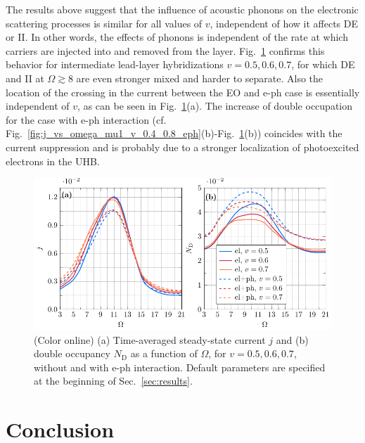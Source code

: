 \documentclass[aps,prb,groupedaddress,showpacs,twocolumn,superscriptaddress,10pt]{revtex4-2}
\begin{document}
The results above suggest that the influence of acoustic phonons on the electronic scattering processes is similar for all values of $v$, independent of how it affects DE or II. In other words, the effects of phonons is independent of the rate at which carriers are injected into and removed from the layer.
 Fig.~\ref{fig:j_vs_omega_mu1_sweep_v_E0_2_eph} confirms this behavior for intermediate lead-layer hybridizations $v=0.5,0.6,0.7$, for which DE and II at $\Omega\gtrsim8$ are even stronger mixed and harder to separate. Also the location of the crossing in the current  between the EO and e-ph case is essentially independent of $v$, as can be seen in 
 Fig.~\ref{fig:j_vs_omega_mu1_sweep_v_E0_2_eph}(a).
The increase of double occupation for the case with e-ph interaction 
(cf. Fig.~\ref{fig:j_vs_omega_mu1_v_0.4_0.8_eph}(b)-Fig.~\ref{fig:j_vs_omega_mu1_sweep_v_E0_2_eph}(b))
coincides with the current suppression and is probably due to a stronger localization of photoexcited electrons in the UHB.

\begin{figure}[b] 
\includegraphics[width=\linewidth]{./figures_Paper1/j_vs_omega_mu1_sweep_v_E0_2_eph.pdf}
\caption{(Color online) (a) Time-averaged steady-state current $j$ and (b) double occupancy $N_{\text{D}}$ as a function of $\Omega$, for $v=0.5,0.6,0.7$, without and with e-ph interaction. Default parameters are specified at the beginning of Sec.~\ref{sec:results}.} 
\label{fig:j_vs_omega_mu1_sweep_v_E0_2_eph}
\end{figure} 


\section{Conclusion}
\label{sec:conclusions} 
\end{document}
